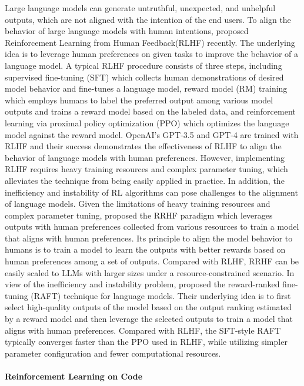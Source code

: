 \documentclass{article}
\begin{document}
Large language models can generate untruthful, unexpected, and unhelpful outputs, which are not aligned with the intention of the end users. To align the behavior of large language models with human intentions, \citet{DBLP:conf/nips/Ouyang0JAWMZASR22} proposed Reinforcement Learning from Human Feedback(RLHF) recently. The underlying idea is to leverage human preferences on given tasks to improve the behavior of a language model. A typical RLHF procedure consists of three steps, including supervised fine-tuning (SFT) which collects human demonstrations of desired model behavior and fine-tunes a language model, reward model (RM) training which employs humans to label the preferred output among various model outputs and trains a reward model based on the labeled data, and reinforcement learning via proximal policy optimization (PPO) which optimizes the language model against the reward model. OpenAI's GPT-3.5 and GPT-4 are trained with RLHF and their success demonstrates the effectiveness of RLHF to align the behavior of language models with human preferences. However, implementing RLHF requires heavy training resources and complex parameter tuning, which alleviates the technique from being easily applied in practice. In addition, the inefficiency and instability of RL algorithms can pose challenges to the alignment of language models. Given the limitations of heavy training resources and complex parameter tuning, \cite{rrhf} proposed the RRHF paradigm which leverages outputs with human preferences collected from various resources to train a model that aligns with human preferences. Its principle to align the model behavior to humans is to train a model to learn the outputs with better rewards based on human preferences among a set of outputs. Compared with RLHF, RRHF can be easily scaled to LLMs with larger sizes under a resource-constrained scenario. In view of the inefficiency and instability problem, \cite{dong2023raft} proposed the reward-ranked fine-tuning (RAFT) technique for language models. Their underlying idea is to first select high-quality outputs of the model based on the output ranking estimated by a reward model and then leverage the selected outputs to train a model that aligns with human preferences. Compared with RLHF, the SFT-style RAFT typically converges faster than the PPO used in RLHF, while utilizing simpler parameter configuration and fewer computational resources.


\paragraph{Reinforcement Learning on Code}
\end{document}
